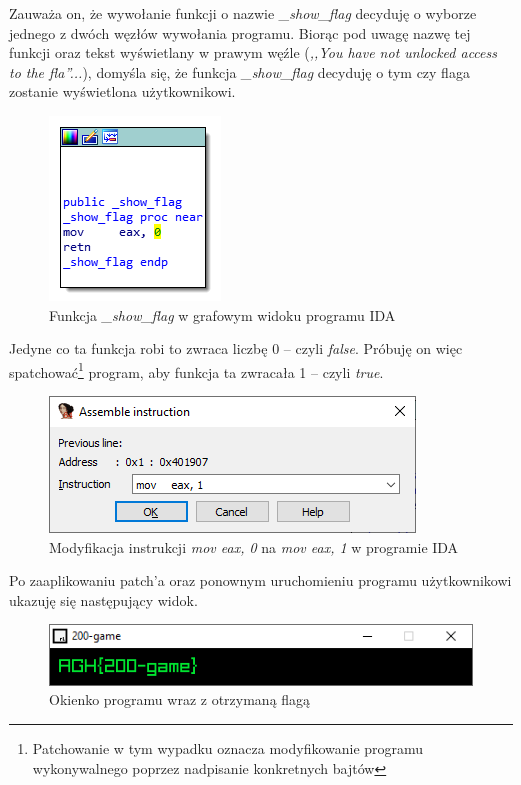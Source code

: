 \documentclass[language=polish,type=eng]{aghmodern}
\begin{document}
\begin{appendices}
Zauważa on, że wywołanie funkcji o nazwie \emph{\_show\_flag} decyduję o wyborze jednego
z dwóch węzłów wywołania programu. Biorąc pod uwagę nazwę tej funkcji oraz tekst
wyświetlany w prawym węźle (\textit{,,You have not unlocked access to the fla''...}), domyśla
się, że funkcja \emph{\_show\_flag} decyduję o tym czy flaga zostanie wyświetlona użytkownikowi.

\begin{figure}[H]
\centering
\includegraphics{200_ida_show_flag}
\caption{Funkcja \emph{\_show\_flag} w grafowym widoku programu IDA}
\end{figure}

Jedyne co ta funkcja robi to zwraca liczbę 0 -- czyli \emph{false}.
Próbuję on więc spatchować\footnote{Patchowanie w tym wypadku oznacza modyfikowanie programu
wykonywalnego poprzez nadpisanie konkretnych bajtów}
program, aby funkcja ta zwracała 1 -- czyli \emph{true}.

\begin{figure}[H]
\centering
\includegraphics{200_ida_patch}
\caption{Modyfikacja instrukcji \emph{mov eax, 0} na \emph{mov eax, 1} w programie IDA}
\end{figure}

Po zaaplikowaniu patch'a oraz ponownym uruchomieniu programu użytkownikowi ukazuję się
następujący widok.

\begin{figure}[H]
\centering
\includegraphics{200_flag}
\caption{Okienko programu wraz z otrzymaną flagą}
\end{figure}


\end{appendices}
\end{document}

